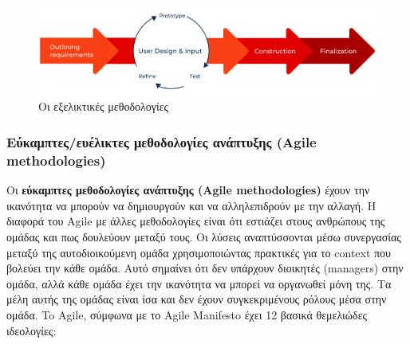 \begin{figure}[th]
  \centering
  \includegraphics[width=150mm]{Figures/rad.png}
  \caption{Οι εξελικτικές μεθοδολογίες}
  \label{fig:rad}
\end{figure}

\subsubsection{Εύκαμπτες/ευέλικτες μεθοδολογίες ανάπτυξης (Agile methodologies)}

Οι \textbf{εύκαμπτες μεθοδολογίες ανάπτυξης (Agile methodologies)} έχουν την ικανότητα να μπορούν να δημιουργούν και να αλληλεπιδρούν με την αλλαγή.
Η διαφορά του Agile με άλλες μεθοδολογίες είναι ότι εστιάζει στους ανθρώπους της ομάδας και πως δουλεύουν μεταξύ τους.
Οι λύσεις αναπτύσσονται μέσω συνεργασίας μεταξύ της αυτοδιοικούμενη ομάδα χρησιμοποιώντας πρακτικές για το context που βολεύει την κάθε ομάδα.
Αυτό σημαίνει ότι δεν υπάρχουν διοικητές (managers) στην ομάδα, αλλά κάθε ομάδα έχει την ικανότητα να μπορεί να οργανωθεί μόνη της.
Τα μέλη αυτής της ομάδας είναι ίσα και δεν έχουν συγκεκριμένους ρόλους μέσα στην ομάδα.
To Agile, σύμφωνα με το Agile Manifesto έχει 12 βασικά θεμελιώδες ιδεολογίες:

